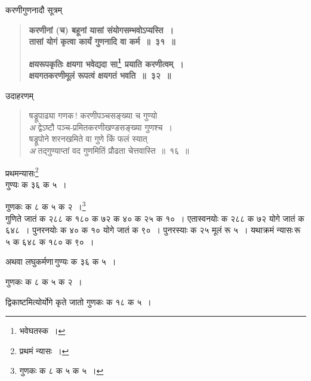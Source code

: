 \documentclass[11pt, openany]{book}
\begin{document}
करणीगुणनादौ सूत्रम् \textendash 

\begin{quote}
\textbf{{\color{purple}करणीनां (च) बहूनां यासां संयोगसम्भवोऽप्यस्ति~।\\
तासां योगं कृत्वा कार्यं गुणनादि वा कर्म~॥~३१~॥}}
\vspace{1mm}

\textbf{{\color{purple}क्षयरूपकृतिः क्षयगा भवेद्यदा सा\renewcommand{\thefootnote}{२}\footnote{भवेघतस्क~।} प्रयाति करणीत्वम्~।\\
क्षयगतकरणीमूलं रूपत्वं क्षयगतं भवति~॥~३२~॥}}
\end{quote}

उदाहरणम् \textendash 

\begin{quote}
{\color{red}षड्रूपाढ्या गणक\,! करणीपञ्चसङ्ख्या च गुण्यो\\
\emph{\color{white}अ} \hspace{2mm} द्वेऽष्टौ पञ्च-प्रमितकरणीखण्डसङ्ख्या गुणश्च~। \\
षड्रूपोने शरनखमिते वा गुणे किं फलं स्यात् \\
\emph{\color{white}अ} \hspace{2mm} तद्गुण्याप्तां वद गुणमितिं प्रौढता चेत्तवास्ति~॥~१६~॥}
\end{quote}

प्रथमन्यासः\renewcommand{\thefootnote}{३}\footnote{प्रथमं न्यासः~।} \textendash \\

\hspace{10mm} गुण्यः क ३६ क ५~। 
\vspace{2mm}

\hspace{10mm} गुणकः क ८ क ५ क २~।\renewcommand{\thefootnote}{४}\footnote{गुणकः क ८ क ५ क ५~।} \\

गुणिते जातं क २८८ क १८० क ७२ क ४० क २५ क १०~। 
एतास्वनयोः क २८८ क ७२ योगे जातं क ६४८~। पुनरनयोः क ४० क १० योगे जातं क ९०~। पुनरस्याः क २५ मूलं रू ५~। यथाक्रमं न्यासः\textendash \,रू ५ क ६४८ क १८० क ९०~।
\vspace{20mm}

\newpage

अथवा लघुकर्मणा\textendash \,गुण्यः क ३६ क ५~।
\vspace{2mm}

\hspace{26mm} गुणकः क ८ क ५ क २~। 
\vspace{2mm}

\noindent द्विकाष्टमित्योर्योगे कृते जातो गुणकः क १८ क ५~। 
\vspace{2mm}
\end{document}
